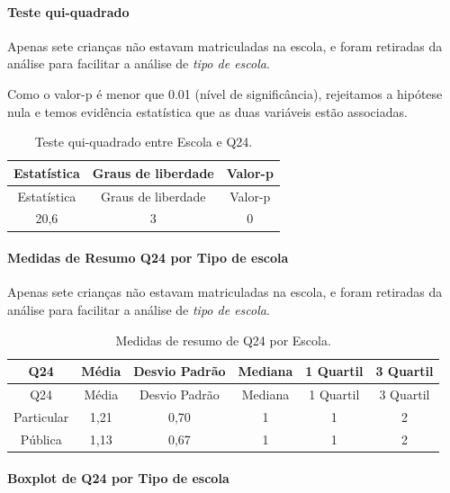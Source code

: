 \documentclass[]{article}
\let\oldparagraph\paragraph
\renewcommand{\paragraph}[1]{\oldparagraph{#1}\mbox{}}
\begin{document}
\hypertarget{teste-qui-quadrado-56}{%
\paragraph{Teste qui-quadrado}\label{teste-qui-quadrado-56}}

Apenas sete crianças não estavam matriculadas na escola, e foram retiradas da análise para facilitar a análise de \emph{tipo de escola}.

Como o valor-p é menor que 0.01 (nível de significância), rejeitamos a hipótese nula e temos evidência estatística que as duas variáveis estão associadas.

\begin{longtable}[]{@{}ccc@{}}
\caption{\label{tab:unnamed-chunk-646}Teste qui-quadrado entre Escola e Q24.}\tabularnewline
\toprule
Estatística & Graus de liberdade & Valor-p\tabularnewline
\midrule
\endfirsthead
\toprule
Estatística & Graus de liberdade & Valor-p\tabularnewline
\midrule
\endhead
20,6 & 3 & 0\tabularnewline
\bottomrule
\end{longtable}

\cleardoublepage

\hypertarget{medidas-de-resumo-q24-por-tipo-de-escola}{%
\paragraph{Medidas de Resumo Q24 por Tipo de escola}\label{medidas-de-resumo-q24-por-tipo-de-escola}}

Apenas sete crianças não estavam matriculadas na escola, e foram retiradas da análise para facilitar a análise de \emph{tipo de escola}.

\begin{longtable}[]{@{}cccccc@{}}
\caption{\label{tab:unnamed-chunk-647}Medidas de resumo de Q24 por Escola.}\tabularnewline
\toprule
Q24 & Média & Desvio Padrão & Mediana & 1 Quartil & 3 Quartil\tabularnewline
\midrule
\endfirsthead
\toprule
Q24 & Média & Desvio Padrão & Mediana & 1 Quartil & 3 Quartil\tabularnewline
\midrule
\endhead
Particular & 1,21 & 0,70 & 1 & 1 & 2\tabularnewline
Pública & 1,13 & 0,67 & 1 & 1 & 2\tabularnewline
\bottomrule
\end{longtable}

\hypertarget{boxplot-de-q24-por-tipo-de-escola}{%
\paragraph{Boxplot de Q24 por Tipo de escola}\label{boxplot-de-q24-por-tipo-de-escola}}
\end{document}
